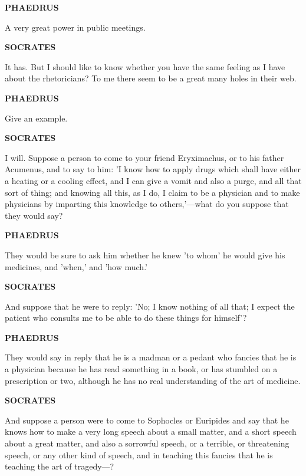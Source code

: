 \documentclass[11pt,letter]{article}
\begin{document}
\par \textbf{PHAEDRUS}
\par   A very great power in public meetings.

\par \textbf{SOCRATES}
\par   It has. But I should like to know whether you have the same feeling as I have about the rhetoricians? To me there seem to be a great many holes in their web.

\par \textbf{PHAEDRUS}
\par   Give an example.

\par \textbf{SOCRATES}
\par   I will. Suppose a person to come to your friend Eryximachus, or to his father Acumenus, and to say to him:  'I know how to apply drugs which shall have either a heating or a cooling effect, and I can give a vomit and also a purge, and all that sort of thing; and knowing all this, as I do, I claim to be a physician and to make physicians by imparting this knowledge to others,'—what do you suppose that they would say?

\par \textbf{PHAEDRUS}
\par   They would be sure to ask him whether he knew 'to whom' he would give his medicines, and 'when,' and 'how much.'

\par \textbf{SOCRATES}
\par   And suppose that he were to reply:  'No; I know nothing of all that; I expect the patient who consults me to be able to do these things for himself'?

\par \textbf{PHAEDRUS}
\par   They would say in reply that he is a madman or a pedant who fancies that he is a physician because he has read something in a book, or has stumbled on a prescription or two, although he has no real understanding of the art of medicine.

\par \textbf{SOCRATES}
\par   And suppose a person were to come to Sophocles or Euripides and say that he knows how to make a very long speech about a small matter, and a short speech about a great matter, and also a sorrowful speech, or a terrible, or threatening speech, or any other kind of speech, and in teaching this fancies that he is teaching the art of tragedy—?
\end{document}
